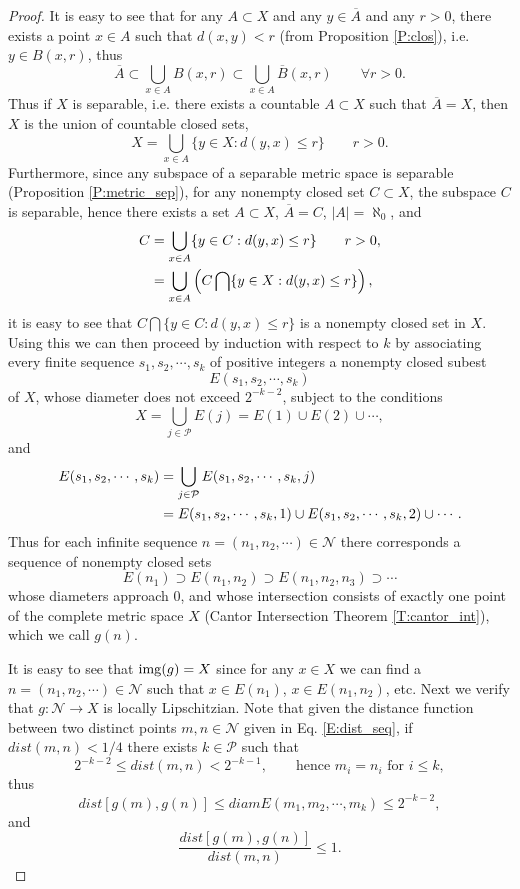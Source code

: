 \begin{proof}
It is easy to see that for any $A\subset X$ and any $y\in \overline{A}$ and any 
$r>0$, there exists a point $x\in A$ such that $d(x,y)<r$ (from Proposition 
\ref{P:clos}), i.e. $y\in B(x,r)$, thus
\[
  \overline{A} \subset \bigcup_{x\in A} B(x,r) 
          \subset \bigcup_{x\in A} \overline{B}(x,r) \qquad \forall r>0.
\]
Thus if $X$ is separable, i.e. there exists a countable $A\subset X$ such that 
$\overline{A}=X$, then $X$ is the union of countable closed sets,
\[
  X = \bigcup_{x\in A} \{y\in X: d(y,x)\leq r \} \qquad r>0.
\]
Furthermore, since any subspace of a separable metric space is separable
(Proposition \ref{P:metric_sep}), for any nonempty closed set $C\subset X$, the 
subspace $C$ is separable, hence there exists a set $A\subset X$, 
$\overline{A}=C$, $|A|=\aleph_0$, and 
\begin{align*}
  C &= \bigcup_{x\in A} \{y\in C: d(y,x)\leq r \} \qquad r>0, \notag \\
    &= \bigcup_{x\in A} \left( C\bigcap \{y\in X: d(y,x)\leq r \} \right)  
       \notag,
\end{align*}
it is easy to see that $C\bigcap \{y\in C: d(y,x)\leq r \}$ is a nonempty
closed set in $X$. 
Using this we can then proceed by induction
with respect to $k$ by associating every finite sequence $s_1,s_2,\cdots,s_k$
of positive integers a nonempty closed subest 
\[
  E(s_1,s_2,\cdots,s_k)
\]
of $X$, whose diameter does not exceed $2^{-k-2}$, subject to the conditions
\[
  X=\bigcup_{j\in\mathcal{P}} E(j) = E(1)\cup E(2)\cup\cdots,
\]
and
\begin{align*}
  E(s_1,s_2,\cdots,s_k) 
    &= \bigcup_{j\in\mathcal{P}} E(s_1,s_2,\cdots,s_k,j) \notag \\
    &= E(s_1,s_2,\cdots,s_k,1) \cup E(s_1,s_2,\cdots,s_k,2) \cup \cdots. \notag
\end{align*}
Thus for each infinite sequence $n=(n_1,n_2,\cdots)\in\mathcal{N}$ there
corresponds a sequence of nonempty closed sets
\[
  E(n_1)\supset E(n_1,n_2) \supset E(n_1,n_2,n_3) \supset \cdots
\]
whose diameters approach $0$, and whose intersection consists of exactly one
point of the complete metric space $X$ (Cantor Intersection Theorem 
\ref{T:cantor_int}), which we call $g(n)$.

It is easy to see that $\operatorname*{img}(g)=X$ since for any $x\in X$ we can find a 
$n=(n_1,n_2,\cdots)\in\mathcal{N}$ such that $x\in E(n_1)$, $x\in E(n_1,n_2)$,
etc. Next we verify that $g:\mathcal{N}\to X$ is locally Lipschitzian. Note that
given the distance function between two distinct points $m,n\in \mathcal{N}$
given in Eq. \ref{E:dist_seq}, if $dist(m,n)<1/4$ there exists 
$k\in \mathcal{P}$ such that 
\[
  2^{-k-2}\leq dist(m,n) < 2^{-k-1}, 
    \qquad \text{hence $m_i=n_i$ for $i\leq k$},
\]
thus
\[
  dist[g(m),g(n)]\leq diam E(m_1,m_2,\cdots,m_k)\leq 2^{-k-2},
\]
and 
\[
  \frac{dist[g(m),g(n)]}{dist(m,n)} \leq 1.
\]
\end{proof}

